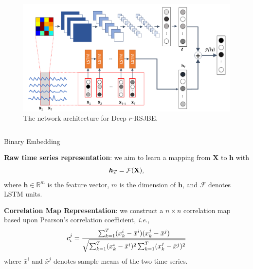 \documentclass[final]{beamer}
\newlength{\onecolwid}
\newlength{\twocolwid}
\begin{document}
\begin{frame}[t]
\begin{columns}[t]
\begin{column}{\twocolwid}
\begin{figure}
\includegraphics[width=0.8\linewidth]{fig2.png}
\caption{The network architecture for Deep $r$-RSJBE.}
\end{figure}

\begin{columns}[t,totalwidth=\twocolwid] %

\begin{column}{\onecolwid}\vspace{-.6in} %


\begin{block}{Binary Embedding}

\textbf{Raw time series representation}:
we aim to learn a mapping from 
$\bm{X}$ to $\bm{h}$  with
\vspace{2mm}
\begin{equation}\label{hp}
\bm{h}_{T} = \mathcal{F}(\mathbf{X}),
\vspace{2mm}
\end{equation}
where $\bm{h}\in \mathbb{R}^m$ is the feature vector, $m$ is the dimension of $\bm{h}$, and $\mathcal{F}$ denotes LSTM units.

\textbf{Correlation Map Representation}:
we construct a $n\times n$ correlation map based upon Pearson's correlation coefficient, \textit{i.e.},
\begin{equation}\label{hp}
\vspace{2mm}
c_{i}^{j}=\frac{\sum_{k=1}^{T}(x^i_k-\bar{x}^i)(x^j_k-\bar{x}^j)}{\sqrt{\sum_{k=1}^{T}(x^i_k-\bar{x}^i)^2\sum_{k=1}^{T}(x^j_k-\bar{x}^j)^2}}
\vspace{2mm}
\end{equation}
where $\bar{x}^i$ and $\bar{x}^j$ denotes sample means of the two time series.


\end{block}
\end{column}
\end{columns}
\end{column}
\end{columns}
\end{frame}
\end{document}
